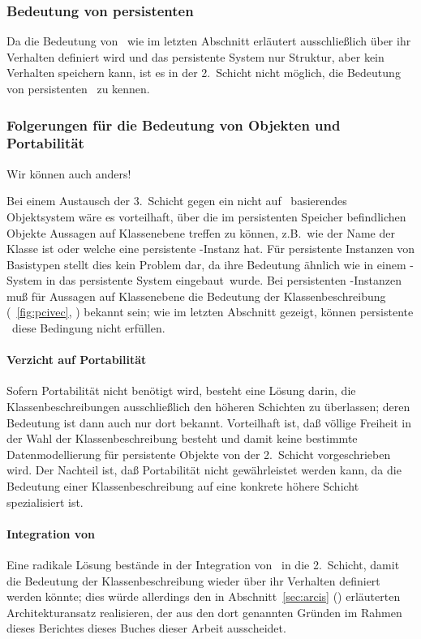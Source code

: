 \subsubsection{Bedeutung von persistenten \protect\mo[en]}
%
Da die Bedeutung von \mo[en]\ wie im letzten Abschnitt
erl\"{a}utert ausschlie\ss{}lich \"{u}ber ihr Verhalten definiert wird und das
persistente System nur Struktur, aber kein Verhalten speichern kann,
ist es in der 2.~Schicht nicht m\"{o}glich, die Bedeutung von
persistenten \mo[en]\ zu kennen.
%
\subsubsection{Folgerungen f\"{u}r die Bedeutung von Objekten und
Portabilit\"{a}t}%
%
\begin{fortune}[6cm]%
Wir k\"{o}n\-nen auch anders!
\end{fortune}%
\nopagebreak[4]%
%
Bei einem Austausch der 3.~Schicht gegen ein nicht auf
\clos\ basierendes Objektsystem w\"{a}re es vorteilhaft, \"{u}ber die im
persistenten Speicher befindlichen Objekte Aussagen auf Klassenebene
treffen zu k\"{o}n\-nen, z.B.\ wie der Name der Klasse ist oder welche
\Slt[s]\/ eine persistente \clos-Instanz hat. F\"{u}r persistente 
Instanzen von Basistypen stellt dies kein Problem dar, da ihre
Bedeutung \"{a}hn\-lich wie in einem \cl-System in das persistente
System \rglq{}eingebaut\rgrq\ wurde. Bei persistenten \clos-Instanzen
mu\ss{} f\"{u}r Aussagen auf Klassenebene die Bedeutung der
Klassenbeschreibung (\figurename~\ref{fig:pcivec},
\citepage{\pageref{fig:pcivec}}) bekannt sein; wie im letzten
Abschnitt gezeigt, k\"{o}n\-nen persistente \mo[e]\ diese Bedingung nicht
erf\"{u}llen.
%
\paragraph{Verzicht auf Portabilit\"{a}t}%
%
Sofern Portabilit\"{a}t nicht ben\"{o}tigt wird, besteht eine L\"{o}sung darin,
die Klassenbeschreibungen ausschlie\ss{}lich den h\"{o}heren Schichten zu
\"{u}berlassen; deren Bedeutung ist dann auch nur dort
bekannt. Vorteilhaft ist, da\ss{} v\"{o}llige Freiheit in der Wahl der
Klassenbeschreibung besteht und damit keine bestimmte
Datenmodellierung f\"{u}r persistente Objekte von der 2.~Schicht
vorgeschrieben wird. Der Nachteil ist, da\ss{} Portabilit\"{a}t nicht
gew\"{a}hrleistet werden kann, da die Bedeutung einer Klassenbeschreibung
auf eine konkrete h\"{o}here Schicht spezialisiert ist.
%
\paragraph{Integration von \protect\clos}%
%
Eine radikale L\"{o}sung best\"{a}nde in der Integration von \clos\ in
die 2.~Schicht, damit die Bedeutung der Klassenbeschreibung wieder
\"{u}ber ihr Verhalten definiert werden k\"{o}nnte; dies w\"{u}rde
allerdings den in Abschnitt~\ref{sec:arcis}
(\citepage{\pageref{sec:arcis}}) erl\"{a}uterten Architekturansatz
realisieren, der aus den dort genannten Gr\"{u}nden im Rahmen
\ifbericht dieses Berichtes \else\ifbuch dieses Buches \else dieser
Arbeit \fi\fi ausscheidet.
%
